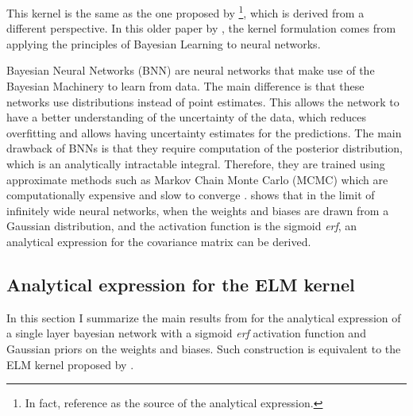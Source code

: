 This kernel is the same as the one proposed by
\textcite{williamsComputationInfiniteNeural1998}\footnote{ In fact,
    \textcite{frenayParameterinsensitiveKernelExtreme2011} reference
    \textcite{williamsComputationInfiniteNeural1998} as the source of the
    analytical expression.
}, which is derived from a different perspective. In this older paper by
\citeauthor{williamsComputationInfiniteNeural1998}, the kernel formulation comes
from applying the principles of Bayesian Learning to neural
networks\cite{nealBayesianLearningNeural1996,bishopBayesianNeuralNetworks1997}.

Bayesian Neural Networks (BNN) are neural networks that make use of the Bayesian
Machinery to learn from data. The main difference is that these networks use
distributions instead of point estimates\cite{nealBayesianLearningNeural1996}.
This allows the network to have a better understanding of the uncertainty of the
data, which reduces overfitting and allows having uncertainty estimates for the
predictions. The main drawback of BNNs is that they require computation of the
posterior distribution, which is an analytically intractable integral.
Therefore, they are trained using approximate methods such as Markov Chain Monte
Carlo (MCMC) which are computationally expensive and slow to converge
\cite{nealBayesianTrainingBackpropagation1992}.
\Textcite{williamsComputationInfiniteNeural1998} shows that in the limit of
infinitely wide neural networks, when the weights and biases are drawn from a
Gaussian distribution, and the activation function is the sigmoid \emph{erf}, an
analytical expression for the covariance matrix can be derived.

\subsection{Analytical expression for the ELM kernel}

In this section I summarize the main results from
\textcite{williamsComputationInfiniteNeural1998} for the analytical expression
of a single layer bayesian network with a sigmoid \emph{erf} activation function
and Gaussian priors on the weights and biases. Such construction is equivalent
to the ELM kernel proposed by
\textcite{frenayParameterinsensitiveKernelExtreme2011}.

